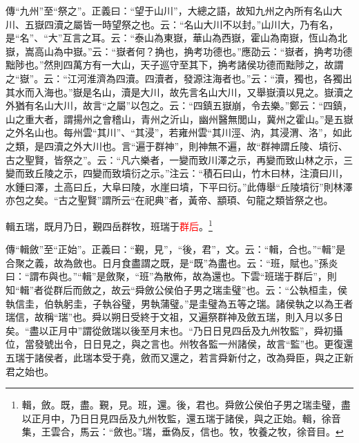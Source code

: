 {\noindent\zhuan{}\fzbyks 傳“九州”至“祭之”。正義曰：“望于山川”，大總之語，故知九州之內所有名山大川、五嶽四瀆之屬皆一時望祭之也。云：“名山大川不以封。”山川大，乃有名，是“名”、“大”互言之耳。云：“泰山為東嶽，華山為西嶽，霍山為南嶽，恆山為北嶽，嵩高山為中嶽。”云：“嶽者何？捔也，捔考功德也。”應劭云：“嶽者，捔考功德黜陟也。”然則四萬方有一大山，天子巡守至其下，捔考諸侯功德而黜陟之，故謂之“嶽”。云：“江河淮濟為四瀆。四瀆者，發源注海者也。”云：“瀆，獨也，各獨出其水而入海也。”嶽是名山，瀆是大川，故先言名山大川，又舉嶽瀆以見之。嶽瀆之外猶有名山大川，故言“之屬”以包之。云：“四鎮五嶽崩，令去樂。”鄭云：“四鎮，山之重大者，謂揚州之會稽山，青州之沂山，幽州醫無閭山，冀州之霍山。”是五嶽之外名山也。每州雲“其川”、“其浸”，若雍州雲“其川涇、汭，其浸渭、洛”，如此之類，是四瀆之外大川也。言“遍于群神”，則神無不遍，故“群神謂丘陵、墳衍、古之聖賢，皆祭之”。云：“凡六樂者，一變而致川澤之示，再變而致山林之示，三變而致丘陵之示，四變而致墳衍之示。”注云：“積石曰山，竹木曰林，注瀆曰川，水鍾曰澤，土高曰丘，大阜曰陵，水崖曰墳，下平曰衍。”此傳舉“丘陵墳衍”則林澤亦包之矣。“古之聖賢”謂所云“在祀典”者，黃帝、顓頊、句龍之類皆祭之也。 \par}

輯五瑞，既月乃日，覲四岳群牧，班瑞于\textcolor{red}{群后}。\footnote{輯，斂。既，盡。覲，見。班，還。後，君也。舜斂公侯伯子男之瑞圭璧，盡以正月中，乃日日見四岳及九州牧監，還五瑞于諸侯，與之正始。輯，徐音集，王雲合，馬云：“斂也。”瑞，垂偽反，信也。牧，牧養之牧，徐音目。}

{\noindent\zhuan{}\fzbyks 傳“輯斂”至“正始”。正義曰：“覲，見”，“後，君”，文。云：“輯，合也。”“輯”是合聚之義，故為斂也。日月食盡謂之既，是“既”為盡也。云：“班，賦也。”孫炎曰：“謂布與也。”“輯”是斂聚，“班”為散佈，故為還也。下雲“班瑞于群后”，則知“輯”者從群后而斂之，故云“舜斂公侯伯子男之瑞圭璧”也。云：“公執桓圭，侯執信圭，伯執躬圭，子執谷璧，男執蒲璧。”是圭璧為五等之瑞。諸侯執之以為王者瑞信，故稱“瑞”也。舜以朔日受終于文祖，又遍祭群神及斂五瑞，則入月以多日矣。“盡以正月中”謂從斂瑞以後至月末也。“乃日日見四岳及九州牧監”，舜初攝位，當發號出令，日日見之，與之言也。州牧各監一州諸侯，故言“監”也。更復還五瑞于諸侯者，此瑞本受于堯，斂而又還之，若言舜新付之，改為舜臣，與之正新君之始也。 \par}

